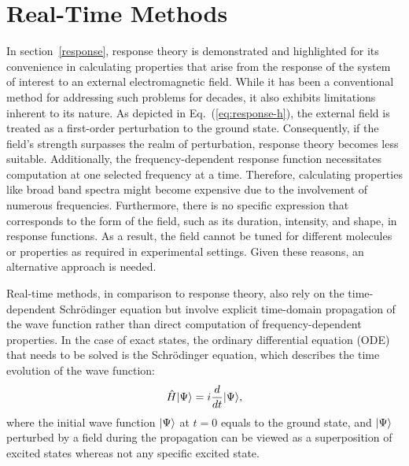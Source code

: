 \section{Real-Time Methods}\label{rt}
In section~\ref{response}, response theory is demonstrated and highlighted for its convenience in calculating properties that arise from the response of the system of interest to an external electromagnetic field. While it has been a conventional method for addressing such problems for decades, it also exhibits limitations inherent to its nature. As depicted in Eq.~(\ref{eq:response-h}), the external field is treated as a first-order perturbation to the ground state. Consequently, if the field's strength surpasses the realm of perturbation, response theory becomes less suitable. Additionally, the frequency-dependent response function necessitates computation at one selected frequency at a time. Therefore, calculating properties like broad band spectra might become expensive due to the involvement of numerous frequencies. Furthermore, there is no specific expression that corresponds to the form of the field, such as its duration, intensity, and shape, in response functions. As a result, the field cannot be tuned for different molecules or properties as required in experimental settings. Given these reasons, an alternative approach is needed.

Real-time methods, in comparison to response theory, also rely on the time-dependent Schr\"odinger equation but involve explicit time-domain propagation of the wave function rather than direct computation of frequency-dependent properties.\cite{Goings2018, Li2020} In the case of exact states, the ordinary differential equation (ODE) that needs to be solved is the Schr\"odinger equation, which describes the time evolution of the wave function:
\begin{equation}
\hat{H}| \Psi \rangle = i\frac{d}{dt}| \Psi \rangle,
\end{equation}
where the initial wave function $| \Psi \rangle$ at $t=0$ equals to the ground state, and $| \Psi \rangle$ perturbed by a field during the propagation can be viewed as a superposition of excited states whereas not any specific excited state. 

